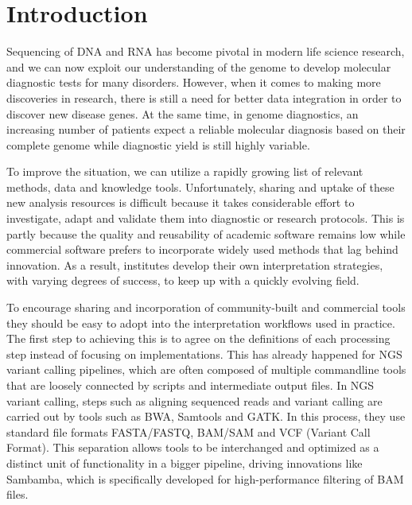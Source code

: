 \section{Introduction}

Sequencing of DNA and RNA has become pivotal in modern life science research, and we can now exploit our understanding of the genome to develop molecular diagnostic tests for many disorders.
However, when it comes to making more discoveries in research, there is still a need for better data integration\cite{Ritchie_2015} in order to discover new disease genes.
At the same time, in genome diagnostics, an increasing number of patients expect a reliable molecular diagnosis based on their complete genome\cite{Berg_2011} while diagnostic yield is still highly variable\cite{Wang_2014, Mart_nez_2016, Daoud_2016, Yubero_2016}.

To improve the situation, we can utilize a rapidly growing list of relevant methods, data and knowledge tools. Unfortunately, sharing and uptake of these new analysis resources is difficult because it takes considerable effort to investigate, adapt and validate them into diagnostic or research protocols.
This is partly because the quality and reusability of academic software remains low\cite{Prins_2015} while commercial software prefers to incorporate widely used methods that lag behind innovation. As a result, institutes develop their own interpretation strategies, with varying degrees of success\cite{Brownstein_2014}, to keep up with a quickly evolving field.

To encourage sharing and incorporation of community-built and commercial tools they should be easy to adopt into the interpretation workflows used in practice.
The first step to achieving this is to agree on the definitions of each processing step instead of focusing on implementations.
This has already happened for NGS variant calling pipelines\cite{Weiss_2013}, which are often composed of multiple commandline tools that are loosely connected by scripts and intermediate output files.
In NGS variant calling, steps such as aligning sequenced reads and variant calling are carried out by tools such as BWA, Samtools and GATK.
In this process, they use standard file formats FASTA/FASTQ, BAM/SAM and VCF (Variant Call Format).
This separation allows tools to be interchanged and optimized as a distinct unit of functionality in a bigger pipeline, driving innovations like Sambamba\cite{Tarasov_2015}, which is specifically developed for high-performance filtering of BAM files.

